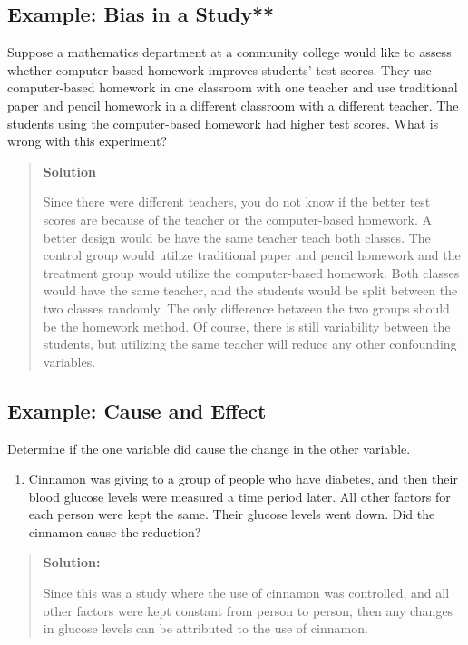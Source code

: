 \documentclass[]{book}
\providecommand{\tightlist}{%
  \setlength{\itemsep}{0pt}\setlength{\parskip}{0pt}}
\begin{document}
\hypertarget{example-bias-in-a-study}{%
\subsection{Example: Bias in a Study**}\label{example-bias-in-a-study}}

Suppose a mathematics department at a community college would like to assess whether computer-based homework improves students' test scores. They use computer-based homework in one classroom with one teacher and use traditional paper and pencil homework in a different classroom with a different teacher. The students using the computer-based homework had higher test scores. What is wrong with this experiment?

\begin{quote}
\textbf{Solution}

Since there were different teachers, you do not know if the better test scores are because of the teacher or the computer-based homework. A better design would be have the same teacher teach both classes. The control group would utilize traditional paper and pencil homework and the treatment group would utilize the computer-based homework. Both classes would have the same teacher, and the students would be split between the two classes randomly. The only difference between the two groups should be the homework method. Of course, there is still variability between the students, but utilizing the same teacher will reduce any other confounding variables.
\end{quote}

\hypertarget{example-cause-and-effect}{%
\subsection{Example: Cause and Effect}\label{example-cause-and-effect}}

Determine if the one variable did cause the change in the other
variable.

\begin{enumerate}
\def\labelenumi{\alph{enumi}.}
\tightlist
\item
  Cinnamon was giving to a group of people who have diabetes, and then their blood glucose levels were measured a time period later. All other factors for each person were kept the same. Their glucose levels went down. Did the cinnamon cause the reduction?
\end{enumerate}

\begin{quote}
\textbf{Solution:}

Since this was a study where the use of cinnamon was controlled, and all other factors were kept constant from person to person, then any changes in glucose levels can be attributed to the use of cinnamon.
\end{quote}
\end{document}
